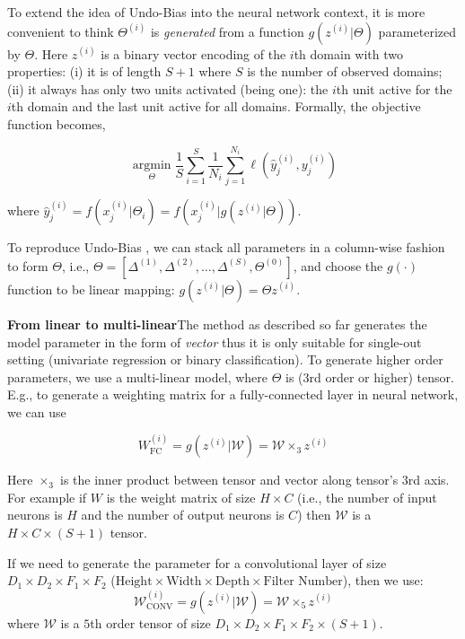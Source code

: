 \documentclass[10pt,twocolumn,letterpaper]{article}
\begin{document}
To extend the idea of Undo-Bias \cite{ECCV12_Khosla} into the neural network context, it is more convenient to think $\Theta^{(i)}$ is \emph{generated} from a function $g(z^{(i)} | \Theta)$ parameterized by $\Theta$. Here $z^{(i)}$ is a binary vector encoding of the $i$th domain with two properties: (i) it is of length $S+1$ where $S$ is the number of observed domains; (ii) it always has only two units activated (being one): the $i$th unit active for the $i$th domain and the last unit active for all domains. Formally, the objective function becomes,

\begin{equation}
\underset{\Theta}{\operatorname{argmin}} \frac{1}{S} \sum^{S}_{i=1}\frac{1}{N_i}\sum^{N_i}_{j=1} \ell(\hat{y}^{(i)}_j,y^{(i)}_j)
\end{equation}

\noindent where $\hat{y}^{(i)}_j = f(x^{(i)}_j | \Theta_i) = f(x^{(i)}_j | g(z^{(i)} | \Theta))$.

To reproduce Undo-Bias \cite{ECCV12_Khosla}, we can stack all parameters in a column-wise fashion to form $\Theta$, i.e., $\Theta = [\Delta^{(1)}, \Delta^{(2)}, \dots, \Delta^{(S)}, \Theta^{(0)}]$, and choose the $g(\cdot)$ function to be linear mapping: $g(z^{(i)} | \Theta) = \Theta z^{(i)}$.

\vspace{0.1cm}\noindent\textbf{From linear to multi-linear}\quad The method as described so far generates the model parameter in the form of \emph{vector} thus it is only suitable for single-out setting (univariate regression or binary classification). To generate higher order parameters, we use a multi-linear model, where $\Theta$ is (3rd order or higher) tensor. E.g., to generate a weighting matrix for a fully-connected layer in neural network, we can use

\begin{equation}
W^{(i)}_{\text{FC}}=g(z^{(i)} | \mathcal{W}) = \mathcal{W}\times_3 z^{(i)}\label{eq:fc-decom}
\end{equation}

\noindent Here $\times_3$ is the inner product between tensor and vector along tensor's $3$rd axis. For example if $W$ is the weight matrix of size $H\times C$ (i.e., the number of input neurons is $H$ and the number of output neurons is $C$) then $\mathcal{W}$ is a $H\times C\times (S+1)$ tensor.

If we need to generate the parameter for a convolutional layer of size $D_1\times D_2 \times F_1 \times F_2$ ($\text{Height} \times \text{Width} \times \text{Depth} \times \text{Filter Number}$), then we use:
\begin{equation}
\mathcal{W}^{(i)}_{\text{CONV}}=g(z^{(i)} | \mathcal{W}) = \mathcal{W}\times_5 z^{(i)}
\end{equation}
\noindent where $\mathcal{W}$ is a $5$th order tensor of size $D_1\times D_2 \times F_1 \times F_2\times (S+1)$.
\end{document}
